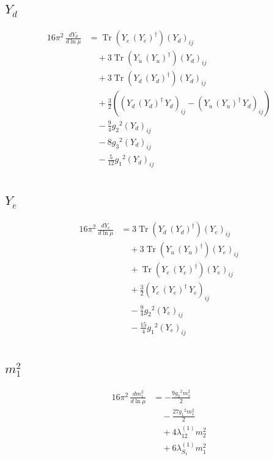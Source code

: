 \documentclass[10pt,a4paper]{article}
\begin{document}
\subsection*{$Y_d$}
\begin{align*}
16\pi^2\,\frac{d Y_d}{d\ln\mu} &=\operatorname{Tr}\!\left({Y_e}\,\left({Y_e}\right)^{\dagger}\right) \left({Y_d}\right)_{ij} \\
&\quad +3 \operatorname{Tr}\!\left({Y_u}\,\left({Y_u}\right)^{\dagger}\right) \left({Y_d}\right)_{ij} \\
&\quad +3 \operatorname{Tr}\!\left({Y_d}\,\left({Y_d}\right)^{\dagger}\right) \left({Y_d}\right)_{ij} \\
&\quad +\frac{3}{2} (\left({Y_d}\,\left({Y_d}\right)^{\dagger}\,{Y_d}\right)_{ij}-\left({Y_u}\,\left({Y_u}\right)^{\dagger}\,{Y_d}\right)_{ij}) \\
&\quad -\frac{9}{4} {g_2}^2 \left({Y_d}\right)_{ij} \\
&\quad -8 {g_3}^2 \left({Y_d}\right)_{ij} \\
&\quad -\frac{5}{12} {g_1}^2 \left({Y_d}\right)_{ij} \\
\end{align*}
\subsection*{$Y_e$}
\begin{align*}
16\pi^2\,\frac{d Y_e}{d\ln\mu} &=3 \operatorname{Tr}\!\left({Y_d}\,\left({Y_d}\right)^{\dagger}\right) \left({Y_e}\right)_{ij} \\
&\quad +3 \operatorname{Tr}\!\left({Y_u}\,\left({Y_u}\right)^{\dagger}\right) \left({Y_e}\right)_{ij} \\
&\quad +\operatorname{Tr}\!\left({Y_e}\,\left({Y_e}\right)^{\dagger}\right) \left({Y_e}\right)_{ij} \\
&\quad +\frac{3}{2} \left({Y_e}\,\left({Y_e}\right)^{\dagger}\,{Y_e}\right)_{ij} \\
&\quad -\frac{9}{4} {g_2}^2 \left({Y_e}\right)_{ij} \\
&\quad -\frac{15}{4} {g_1}^2 \left({Y_e}\right)_{ij} \\
\end{align*}
\subsection*{$m_1^2$}
\begin{align*}
16\pi^2\,\frac{d m_1^2}{d\ln\mu} &=-\frac{9 {g_2}^2 {m_1^2}}{2} \\
&\quad -\frac{27 {g_1}^2 {m_1^2}}{2} \\
&\quad +4 {\lambda_{12}^{(1)}} {m_2^2} \\
&\quad +6 {\lambda_{S_1}^{(1)}} {m_1^2} \\
\end{align*}
\end{document}
